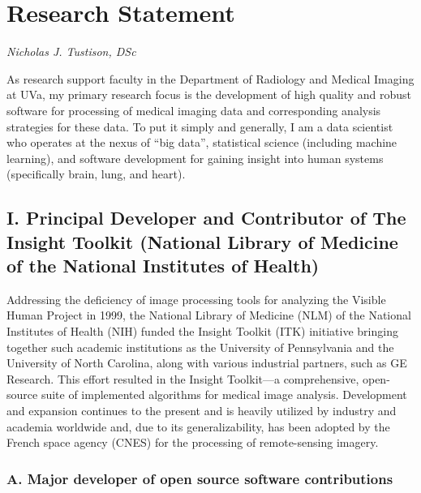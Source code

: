 \documentclass[11pt,]{article}
\title{}
\author{}
\date{}
\begin{document}
\maketitle


\section{Research Statement}\label{research-statement}

\emph{Nicholas J. Tustison, DSc}

As research support faculty in the Department of Radiology and Medical
Imaging at UVa, my primary research focus is the development of high
quality and robust software for processing of medical imaging data and
corresponding analysis strategies for these data. To put it simply and
generally, I am a data scientist who operates at the nexus of ``big
data'', statistical science (including machine learning), and software
development for gaining insight into human systems (specifically brain,
lung, and heart).

\subsection{I. Principal Developer and Contributor of The Insight
Toolkit (National Library of Medicine of the National Institutes of
Health)}\label{i.-principal-developer-and-contributor-of-the-insight-toolkit-national-library-of-medicine-of-the-national-institutes-of-health}

Addressing the deficiency of image processing tools for analyzing the
Visible Human Project in 1999, the National Library of Medicine (NLM) of
the National Institutes of Health (NIH) funded the Insight Toolkit (ITK)
initiative bringing together such academic institutions as the
University of Pennsylvania and the University of North Carolina, along
with various industrial partners, such as GE Research. This effort
resulted in the Insight Toolkit---a comprehensive, open-source suite of
implemented algorithms for medical image analysis. Development and
expansion continues to the present and is heavily utilized by industry
and academia worldwide and, due to its generalizability, has been
adopted by the French space agency (CNES) for the processing of
remote-sensing imagery.

\subsubsection{A. Major developer of open source software
contributions}\label{a.-major-developer-of-open-source-software-contributions}
\end{document}
